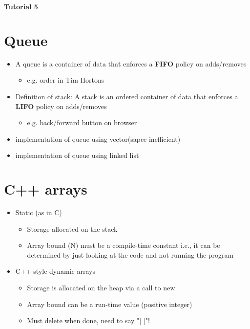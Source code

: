 \documentclass[12pt]{article}
\begin{document}
    
\begin{center}
    \textbf{\huge Tutorial 5}
\end{center}

\section{Queue}
\begin{itemize}
    \item A queue is a container of data that enforces a \textbf{FIFO} policy on adds/removes
    \begin{itemize}
        \item e.g. order in Tim Hortons
    \end{itemize}
    \item Definition of stack: A stack is an ordered container of data that enforces 
            a \textbf{LIFO} policy on adds/removes
    \begin{itemize}
        \item e.g. back/forward button on browser
    \end{itemize}
    \item implementation of queue using vector(sapce inefficient)
    \item implementation of queue using linked list
\end{itemize}

\section{C++ arrays}
\begin{itemize}
    \item Static (as in C)
    \begin{itemize}
        \item Storage allocated on the stack
        \item Array bound (N) must be a compile-time constant
        i.e., it can be determined by just looking at the code and not running the program
    \end{itemize}
    \item C++ style dynamic arrays
    \begin{itemize}
        \item Storage is allocated on the heap via a call to new
        \item Array bound can be a run-time value (positive integer)
        \item Must delete when done, need to say "[ ]"!
    \end{itemize}

\end{itemize}
\end{document}
